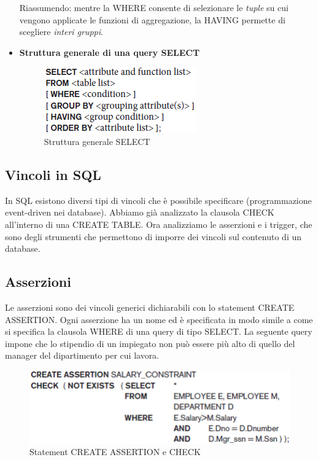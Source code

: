 \begin{itemize}
Riassumendo: mentre la WHERE consente di selezionare le \textit{tuple} su cui vengono applicate le funzioni di aggregazione, la HAVING permette di scegliere \textit{interi gruppi}.


\item{\textbf{Struttura generale di una query SELECT}}

\begin{center}
\begin{figure}[H]
\centering
\includegraphics[scale=1]{figures/SELECT.png}
\caption{Struttura generale SELECT} 
\end{figure}
\end{center}


\end{itemize}


\subsection{Vincoli in SQL}

In SQL esistono diversi tipi di vincoli che è possibile specificare (programmazione event-driven nei database). Abbiamo già analizzato la clausola CHECK all’interno di una CREATE TABLE. Ora analizziamo le asserzioni e i trigger, che sono degli strumenti che permettono di imporre dei vincoli sul contenuto di un database. 


\subsection{Asserzioni}

Le asserzioni sono dei vincoli generici dichiarabili con lo statement CREATE ASSERTION. Ogni asserzione ha un nome ed è specificata in modo simile a come si specifica la clausola WHERE di una query di tipo SELECT. La seguente query impone che lo stipendio di un impiegato non può essere più alto di quello del manager del dipartimento per cui lavora.

\begin{center}
\begin{figure}[H]
\centering
\includegraphics[scale=1]{figures/assertion.png}
\caption{Statement CREATE ASSERTION e CHECK} 
\end{figure}
\end{center}

